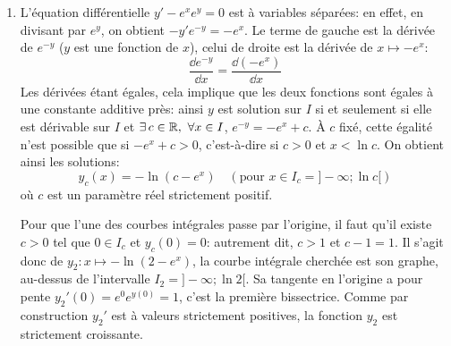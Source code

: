 \documentclass[11pt,a4paper]{article}
\begin{document}
\begin{enumerate}
\item L'équation différentielle $y'-e^xe^y=0$ est à variables séparées: 
en effet, en divisant par $e^{y}$, on obtient $-y'e^{-y}=-e^x$. 
Le terme de gauche est la dérivée de $e^{-y}$ ($y$ est une fonction de $x$), 
celui de droite est la dérivée de $x\mapsto -e^x$: 
$$\frac{\dd e^{-y}}{\dd x} = \frac{\dd (-e^x)}{\dd x}$$
Les dérivées étant égales, cela implique que les deux fonctions sont égales à 
une constante additive près: ainsi $y$ est solution sur $I$ si et seulement si 
elle est dérivable sur $I$ et $\exists\,c\in\mathbb{R},\ \forall x\in I$, $e^{-y}=-e^x+c$. 
\`A $c$ fixé, cette égalité n'est possible que si $-e^x+c>0$, 
c'est-à-dire si $c>0$ et $x<\ln c$. On obtient ainsi les solutions:
$$y_c(x)=-\ln(c-e^x)\quad (\text{pour } x\in I_c=]-\infty;\ln c[)$$
où $c$ est un paramètre réel strictement positif.

Pour que l'une des courbes intégrales passe par l'origine, il faut qu'il existe $c>0$ tel que $0\in I_c$ et $y_c(0)=0$: autrement dit, $c>1$ et $c-1=1$. Il s'agit donc de $y_2:x\mapsto-\ln(2-e^x)$, la courbe intégrale cherchée est son graphe, au-dessus de l'intervalle $I_2=]-\infty;\ln 2[$. Sa tangente en l'origine a pour pente $y_2'(0)=e^0e^{y(0)}=1$, c'est la première bissectrice. Comme par construction $y_2'$ est à valeurs strictement positives, la fonction $y_2$ est strictement croissante.

\end{enumerate}
\end{document}
